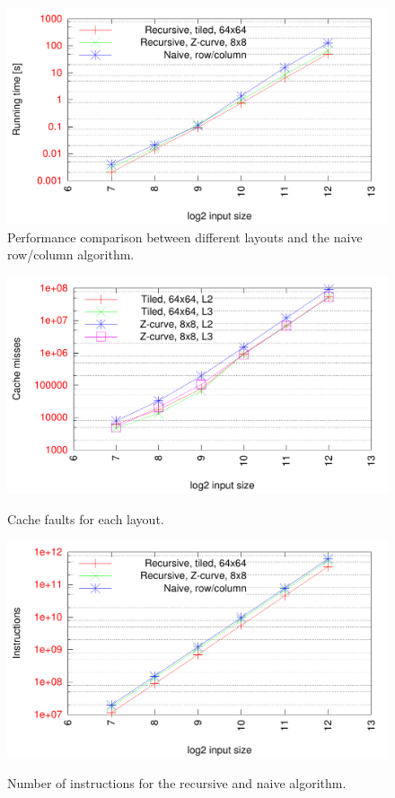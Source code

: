 \begin{figure}[h!]
  \centering
  \includegraphics[width=\textwidth]{"../project2/gnuplots/recursive_performance"}
  \caption{Performance comparison between different layouts and the naive row/column algorithm.}
  \label{fig:recursive_layout_performance}
\end{figure}

\begin{figure}[h!]
  \centering
  \includegraphics[width=\textwidth]{"../project2/gnuplots/recursive_cache"}
  \label{fig:recursive_layout_cachefaults}
  \caption{Cache faults for each layout.}
\end{figure}

\begin{figure}[h!]
  \centering
  \includegraphics[width=\textwidth]{"../project2/gnuplots/recursive_instructions"}
  \label{fig:recursive_layout_instructions}
  \caption{Number of instructions for the recursive and naive algorithm.}
\end{figure}

